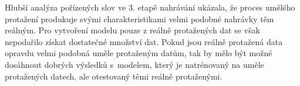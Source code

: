 
Hlubší analýza pořízených slov ve 3. etapě nahrávání ukázala, že proces umělého protažení produkuje svými charakteristikami velmi podobné nahrávky těm reálným.
Pro vytvoření modelu pouze z reálně protažených dat se však nepodařilo získat dostatečné množství dat.
Pokud jsou reálně protažená data opravdu velmi podobná uměle protaženým datům, tak by mělo být možné dosáhnout dobrých výsledků s~modelem, který je natrénovaný na uměle protažených datech, ale otestovaný těmi reálně protaženými.



